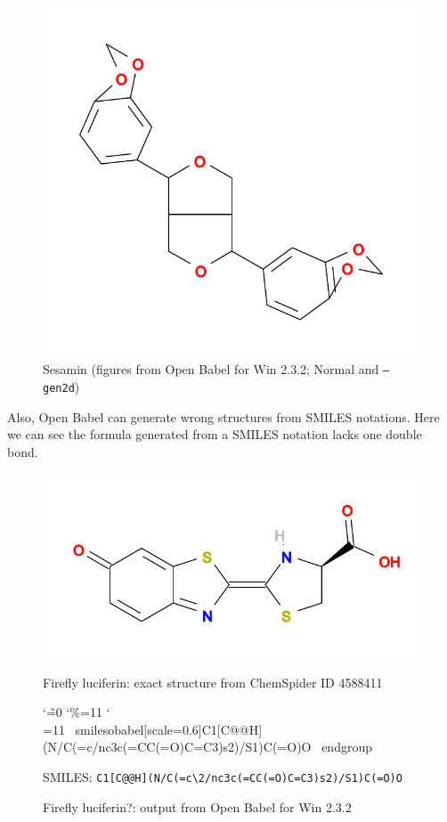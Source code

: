 \documentclass[12pt]{jsarticle}
\begin{document}
\begin{figure}[p]
\begin{center}
  \includegraphics[scale=0.5]{figures/Win232-sesamin-gen2d.pdf}
  \caption{Sesamin (figures from Open Babel for Win 2.3.2; Normal and \texttt{--gen2d})}
\end{center}
\end{figure}

\clearpage

Also, Open Babel can generate wrong structures from SMILES notations.
Here we can see the formula generated from a SMILES notation lacks one double bond.

\begin{figure}[ht]
  \centering
  \includegraphics[scale=0.6]{figures/Exact-FireflyLuciferin.pdf}
  \caption{Firefly luciferin: exact structure from ChemSpider ID 4588411}
  \begingroup
    \catcode`\~=0
    \catcode`\%=11
    \catcode`\\=11
    ~smilesobabel[scale=0.6]{C1[C@@H](N/C(=c\2/nc3c(=CC(=O)C=C3)s2)/S1)C(=O)O}{}
  ~endgroup
  \caption{Firefly luciferin?: output from Open Babel for Win 2.3.2}
  SMILES: \verb|C1[C@@H](N/C(=c\2/nc3c(=CC(=O)C=C3)s2)/S1)C(=O)O|
\end{figure}
\end{document}
